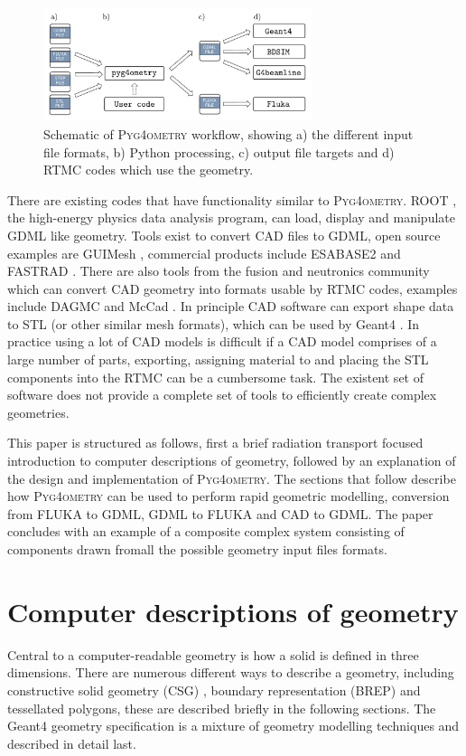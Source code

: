 \documentclass[final,5p,times,twocolumn]{elsarticle}
\newcommand{\PYGEOMETRY}{\textsc{Pyg4ometry}}
\begin{document}
\begin{figure}[hbt!]
  \normalsize
  \centering
  \includegraphics[width=0.7\textwidth]{./diagrams/workflow.pdf}
  \caption{\label{fig:workflow}Schematic of \PYGEOMETRY{} workflow, showing a) the different input file formats, b) Python processing, c) output file targets and d) RTMC codes which use the geometry. }
\end{figure}

There are existing codes that have functionality similar to \PYGEOMETRY{}. ROOT \cite{Brun:1997pa}, the high-energy physics data analysis program, can load, display and manipulate GDML like geometry. Tools exist to convert CAD files to GDML, open source examples are GUIMesh \cite{GUIMesh_Pinto}, commercial products include ESABASE2 \cite{ESABASE2} and FASTRAD \cite{FASTRAD}. There are also tools from the fusion and 
neutronics community which  can convert CAD geometry into formats usable by RTMC codes, examples include DAGMC \cite{DAGMC} and McCad \cite{McCad}.  
In principle CAD software can export shape data to STL (or other similar mesh formats), which can be used by Geant4 \cite{poole2012acad}. In practice using a lot of CAD models is difficult if a CAD model comprises of a large number of parts, exporting, assigning material to and placing the STL components into the RTMC can be a 
cumbersome task. The existent set of software does not provide a complete set of tools to efficiently create complex geometries.

This paper is structured as follows, first a brief radiation transport focused introduction to computer descriptions of geometry, followed by an explanation of the design and implementation of \PYGEOMETRY{}. The sections that follow describe how \PYGEOMETRY{} can be used to perform rapid geometric modelling, conversion from FLUKA to GDML, GDML to FLUKA and CAD to GDML. The paper concludes with an example of a composite complex system consisting of components drawn fromall the possible geometry input files formats.

\section{Computer descriptions of geometry} \label{sec:geometric}
Central to a computer-readable geometry is how a solid is defined in three dimensions. There are numerous different ways to describe a
geometry, including constructive solid geometry (CSG) , boundary representation (BREP) and tessellated polygons, these are described 
briefly in the following sections.  The Geant4 geometry specification is a mixture of geometry modelling techniques and described in detail last.
\end{document}
